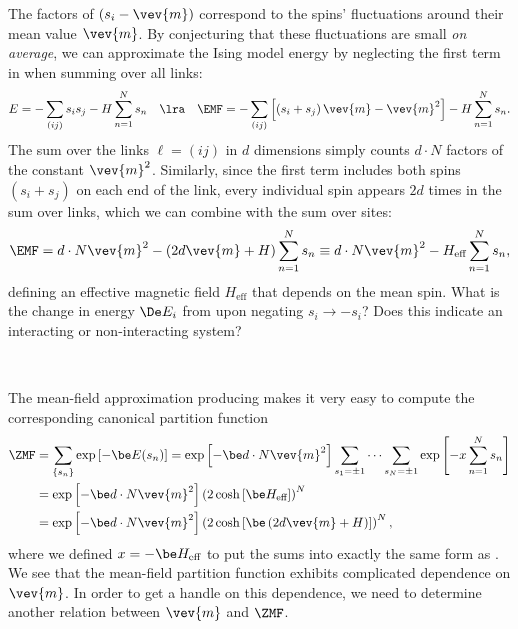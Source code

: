The factors of $\left(s_i - \vev{m}\right)$ correspond to the spins' fluctuations around their mean value $\vev{m}$.
By conjecturing that these fluctuations are small \textit{on average}, we can approximate the Ising model energy by neglecting the first term in  when summing over all links:
\begin{equation*}
  E = -\sum_{(ij)} s_i s_j - H \sum_{n = 1}^N s_n \quad \lra \quad \EMF = -\sum_{(ij)} \left[\left(s_i + s_j\right)\vev{m} - \vev{m}^2\right] - H \sum_{n = 1}^N s_n.
\end{equation*}
The sum over the links $\ell = (ij)$ in $d$ dimensions simply counts $d\cdot N$ factors of the constant $\vev{m}^2$.
Similarly, since the first term includes both spins $\left(s_i + s_j\right)$ on each end of the link, every individual spin appears $2d$ times in the sum over links, which we can combine with the sum over sites:
\begin{equation}
  \label{eq:MF_energy}
  \EMF = d\cdot N \vev{m}^2 - \left(2d\vev{m} + H\right) \sum_{n = 1}^N s_n \equiv d\cdot N \vev{m}^2 - H_{\text{eff}} \sum_{n = 1}^N s_n,
\end{equation}
\newpage %
\noindent defining an effective magnetic field $H_{\text{eff}}$ that depends on the mean spin.
What is the change in energy $\De E_i$ from  upon negating $s_i \to -s_i$?
Does this indicate an interacting or non-interacting system?
\begin{mdframed}
  \ \\[100 pt]
\end{mdframed}

The mean-field approximation producing  makes it very easy to compute the corresponding canonical partition function
\begin{align}
  \ZMF & = \sum_{\left\{s_n\right\}} \exp\left[-\be E(s_n)\right] = \exp\left[-\be d\cdot N \vev{m}^2\right] \sum_{s_1 = \pm 1} \cdots \sum_{s_N = \pm 1} \exp\left[-x \sum_{n = 1}^N s_n\right] \cr
       & = \exp\left[-\be d\cdot N \vev{m}^2\right] \left(2\cosh\left[\be H_{\text{eff}}\right]\right)^N \nonumber \\
       & = \exp\left[-\be d\cdot N \vev{m}^2\right] \left(2\cosh\left[\be \left(2d\vev{m} + H\right)\right]\right)^N,
\end{align}
where we defined $x = -\be H_{\text{eff}}$ to put the sums into exactly the same form as .
We see that the mean-field partition function exhibits complicated dependence on $\vev{m}$.
In order to get a handle on this dependence, we need to determine another relation between $\vev{m}$ and $\ZMF$.


